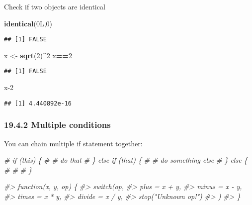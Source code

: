 \documentclass[
]{article}
\newenvironment{Shaded}{\begin{snugshade}}{\end{snugshade}}
\newcommand{\CommentTok}[1]{\textcolor[rgb]{0.56,0.35,0.01}{\textit{#1}}}
\newcommand{\DecValTok}[1]{\textcolor[rgb]{0.00,0.00,0.81}{#1}}
\newcommand{\FunctionTok}[1]{\textcolor[rgb]{0.13,0.29,0.53}{\textbf{#1}}}
\newcommand{\NormalTok}[1]{#1}
\newcommand{\OtherTok}[1]{\textcolor[rgb]{0.56,0.35,0.01}{#1}}
\newcommand{\SpecialCharTok}[1]{\textcolor[rgb]{0.81,0.36,0.00}{\textbf{#1}}}
\begin{document}
Check if two objects are identical

\begin{Shaded}
\begin{Highlighting}[]
\FunctionTok{identical}\NormalTok{(0L,}\DecValTok{0}\NormalTok{)}
\end{Highlighting}
\end{Shaded}

\begin{verbatim}
## [1] FALSE
\end{verbatim}

\begin{Shaded}
\begin{Highlighting}[]
\NormalTok{x }\OtherTok{\textless{}{-}} \FunctionTok{sqrt}\NormalTok{(}\DecValTok{2}\NormalTok{)}\SpecialCharTok{\^{}}\DecValTok{2}
\NormalTok{x}\SpecialCharTok{==}\DecValTok{2}
\end{Highlighting}
\end{Shaded}

\begin{verbatim}
## [1] FALSE
\end{verbatim}

\begin{Shaded}
\begin{Highlighting}[]
\NormalTok{x}\DecValTok{{-}2}
\end{Highlighting}
\end{Shaded}

\begin{verbatim}
## [1] 4.440892e-16
\end{verbatim}

\hypertarget{multiple-conditions}{%
\subsubsection{19.4.2 Multiple conditions}\label{multiple-conditions}}

You can chain multiple if statement together:

\begin{Shaded}
\begin{Highlighting}[]
\CommentTok{\# if (this) \{}
\CommentTok{\#   \# do that}
\CommentTok{\# \} else if (that) \{}
\CommentTok{\#   \# do something else}
\CommentTok{\# \} else \{}
\CommentTok{\#   \# }
\CommentTok{\# \}}
\end{Highlighting}
\end{Shaded}

\begin{Shaded}
\begin{Highlighting}[]
\CommentTok{\#\textgreater{} function(x, y, op) \{}
\CommentTok{\#\textgreater{}   switch(op,}
\CommentTok{\#\textgreater{}     plus = x + y,}
\CommentTok{\#\textgreater{}     minus = x {-} y,}
\CommentTok{\#\textgreater{}     times = x * y,}
\CommentTok{\#\textgreater{}     divide = x / y,}
\CommentTok{\#\textgreater{}     stop("Unknown op!")}
\CommentTok{\#\textgreater{}   )}
\CommentTok{\#\textgreater{} \}}
\end{Highlighting}
\end{Shaded}
\end{document}

